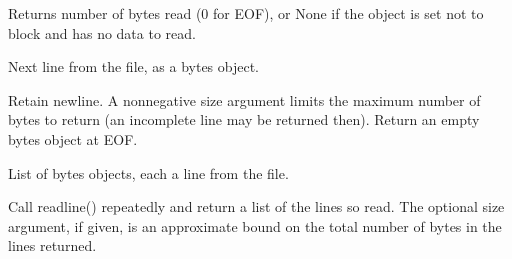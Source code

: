 \documentclass[letterpaper,10pt,english]{sphinxmanual}
\begin{document}
\begin{fulllineitems}
\begin{fulllineitems}
\sphinxAtStartPar
Returns number of bytes read (0 for EOF), or None if the object
is set not to block and has no data to read.

\end{fulllineitems}


\begin{fulllineitems}
\label{\detokenize{modules/src.pig_sorting_streamlit.app:src.pig_sorting_streamlit.app.BytesIO.readline}}
\pysigstartsignatures
\pysiglinewithargsret
{}
{\sphinxparamcomma {}}
{}
\pysigstopsignatures
\sphinxAtStartPar
Next line from the file, as a bytes object.

\sphinxAtStartPar
Retain newline.  A non\sphinxhyphen{}negative size argument limits the maximum
number of bytes to return (an incomplete line may be returned then).
Return an empty bytes object at EOF.

\end{fulllineitems}


\begin{fulllineitems}
\label{\detokenize{modules/src.pig_sorting_streamlit.app:src.pig_sorting_streamlit.app.BytesIO.readlines}}
\pysigstartsignatures
\pysiglinewithargsret
{}
{\sphinxparamcomma {}}
{}
\pysigstopsignatures
\sphinxAtStartPar
List of bytes objects, each a line from the file.

\sphinxAtStartPar
Call readline() repeatedly and return a list of the lines so read.
The optional size argument, if given, is an approximate bound on the
total number of bytes in the lines returned.

\end{fulllineitems}



\end{fulllineitems}
\end{document}
